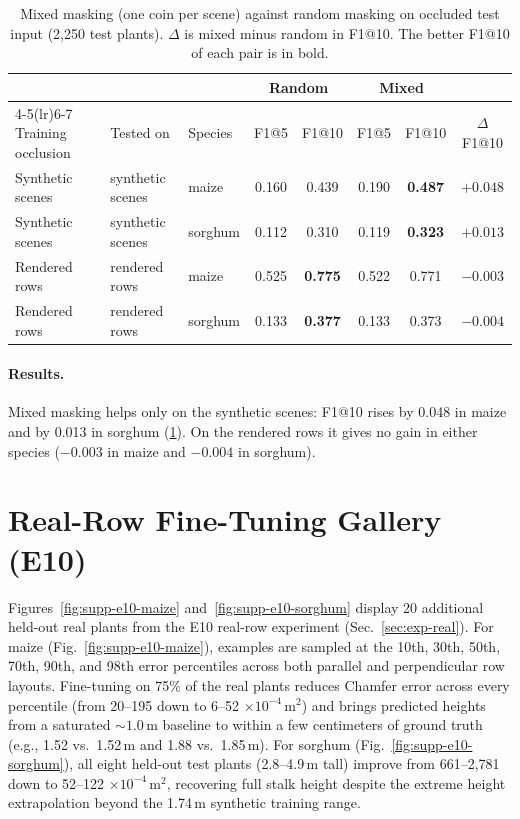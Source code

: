 \documentclass[10pt,twocolumn,letterpaper]{article}
\begin{document}
\begin{table}[t]
  \caption{Mixed masking (one coin per scene) against random masking on occluded test input (2{,}250 test plants).
  $\Delta$ is mixed minus random in F1@10. The better F1@10 of each pair is in bold.}
  \label{tab:mixed_scene}
  \centering
  \small
  \begin{tabular}{@{}lllccccc@{}}
    \toprule
    & & & \multicolumn{2}{c}{Random} & \multicolumn{2}{c}{Mixed} & \\
    \cmidrule(lr){4-5}\cmidrule(lr){6-7}
    Training occlusion & Tested on & Species & F1@5 & F1@10 & F1@5 & F1@10 & $\Delta$F1@10 \\
    \midrule
    Synthetic scenes & synthetic scenes & maize   & 0.160 & 0.439          & 0.190 & \textbf{0.487} & $+0.048$ \\
    Synthetic scenes & synthetic scenes & sorghum & 0.112 & 0.310          & 0.119 & \textbf{0.323} & $+0.013$ \\
    \midrule
    Rendered rows    & rendered rows    & maize   & 0.525 & \textbf{0.775} & 0.522 & 0.771          & $-0.003$ \\
    Rendered rows    & rendered rows    & sorghum & 0.133 & \textbf{0.377} & 0.133 & 0.373          & $-0.004$ \\
    \bottomrule
  \end{tabular}
\end{table}

\paragraph{Results.}
Mixed masking helps only on the synthetic scenes: F1@10 rises by 0.048 in maize and by 0.013 in sorghum
(\cref{tab:mixed_scene}). On the rendered rows it gives no gain in either species ($-0.003$ in maize and $-0.004$
in sorghum).

\section{Real-Row Fine-Tuning Gallery (E10)}
\label{sec:supp-e10}

Figures~\ref{fig:supp-e10-maize} and~\ref{fig:supp-e10-sorghum} display 20 additional held-out real plants from the E10 real-row experiment (Sec.~\ref{sec:exp-real}). For maize (Fig.~\ref{fig:supp-e10-maize}), examples are sampled at the 10th, 30th, 50th, 70th, 90th, and 98th error percentiles across both parallel and perpendicular row layouts. Fine-tuning on 75\% of the real plants reduces Chamfer error across every percentile (from 20--195 down to 6--52 $\times 10^{-4}$\,m$^2$) and brings predicted heights from a saturated $\sim 1.0$\,m baseline to within a few centimeters of ground truth (e.g., 1.52 vs.\ 1.52\,m and 1.88 vs.\ 1.85\,m). For sorghum (Fig.~\ref{fig:supp-e10-sorghum}), all eight held-out test plants (2.8--4.9\,m tall) improve from 661--2{,}781 down to 52--122 $\times 10^{-4}$\,m$^2$, recovering full stalk height despite the extreme height extrapolation beyond the 1.74\,m synthetic training range.
\end{document}
